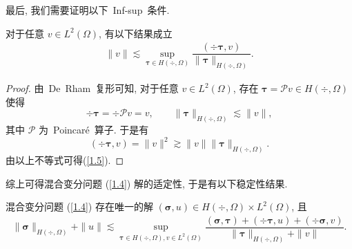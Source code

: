 最后, 我们需要证明以下~Inf-sup~条件.
\begin{lemma}
对于任意 $v\in L^2(\Omega)$, 有以下结果成立
\begin{align}
\label{1.5}
\|v\|\lesssim\sup_{\boldsymbol\tau\in H(\div,\Omega)}\dfrac{(\div\boldsymbol\tau, v)}{\|\boldsymbol\tau\|_{H(\div, \Omega)}}.
\end{align}
\end{lemma}
\begin{proof}
由~De~Rham~复形可知, 对于任意 $v\in L^2(\Omega)$, 存在 $\boldsymbol\tau=\mathcal P v\in H(\div,\Omega)$ 使得
$$\div\boldsymbol\tau=\div\mathcal P v=v, \qquad \|\boldsymbol\tau\|_{H(\div,\Omega)}\lesssim\|v\|,$$
其中 $\mathcal P$ 为~Poincar\'{e}~算子. 于是有
$$(\div\boldsymbol\tau, v)=\|v\|^2\gtrsim \|v\|\|\boldsymbol\tau\|_{H(\div,\Omega)}.$$
由以上不等式可得(\ref{1.5}).
\end{proof}

综上可得混合变分问题 (\ref{1.4}) 解的适定性, 于是有以下稳定性结果.
\begin{theorem}
混合变分问题 (\ref{1.4}) 存在唯一的解 $(\boldsymbol\sigma, u)\in H(\div,\Omega)\times L^2(\Omega)$, 且
\begin{align}
\label{1.6}
\|\boldsymbol\sigma\|_{H(\div,\Omega)}+\|u\|\lesssim\sup_{\boldsymbol\tau\in H(\div,\Omega), v\in L^2(\Omega)}\dfrac{(\boldsymbol\sigma, \boldsymbol\tau)+(\div\boldsymbol\tau, u)+(\div\boldsymbol\sigma, v)}{\|\boldsymbol\tau\|_{H(\div,\Omega)}+\|v\|}.
\end{align}
\end{theorem}


